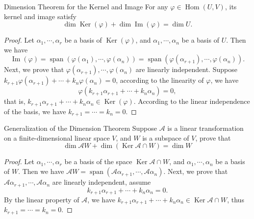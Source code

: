 \begin{theorem}{Dimension Theorem for the Kernel and Image}{}
  For any $\varphi \in \operatorname{Hom}(U, V)$,
  its kernel and image satisfy
  \begin{equation}
    \dim \operatorname{Ker} (\varphi) + \dim \operatorname{Im} (\varphi)
    = \dim U.
  \end{equation}
\end{theorem}

\begin{proof}
  Let $\alpha_1,\cdots,\alpha_r$ be a basis of $\operatorname{Ker}(\varphi)$,
  and $\alpha_1,\cdots,\alpha_n$ be a basis of $U$.
  Then we have
  \begin{equation}
    \operatorname{Im}(\varphi) = \operatorname{span}(\varphi(\alpha_1),\cdots,\varphi(\alpha_n))
    = \operatorname{span}(\varphi(\alpha_{r+1}),\cdots,\varphi(\alpha_n)).
  \end{equation}
  Next, we prove that $\varphi(\alpha_{r+1}),\cdots,\varphi(\alpha_n)$ are
  linearly independent.
  Suppose $k_{r+1}\varphi(\alpha_{r+1}) + \cdots + k_n \varphi(\alpha_n) = 0$,
  according to the linearity of $\varphi$, we have
  \begin{equation}
    \varphi(k_{r+1}\alpha_{r+1} + \cdots + k_n\alpha_n) = 0,
  \end{equation}
  that is, $k_{r+1}\alpha_{r+1} + \cdots + k_n \alpha_n \in \operatorname{Ker}(\varphi)$.
  According to the linear independence of the basis,
  we have $k_{r+1} = \cdots = k_n = 0$.
\end{proof}

\begin{example}{Generalization of the Dimension Theorem}{}
  Suppose $\mathcal{A}$ is a linear transformation on a finite-dimensional
  linear space $V$,
  and $W$ is a subspace of $V$, prove that
  \begin{equation}
    \dim \mathcal{A} W + \dim (\operatorname{Ker} \mathcal{A} \cap W) = \dim W
  \end{equation}
\end{example}

\begin{proof}
  Let $\alpha_1,\cdots,\alpha_r$ be a basis of the space $\operatorname{Ker}
  \mathcal{A} \cap W$,
  and $\alpha_1,\cdots,\alpha_n$ be a basis of $W$.
  Then we have $\mathcal{A}W = \operatorname{span} (\mathcal{A}\alpha_{r+1},\cdots,\mathcal{A}\alpha_n)$.
  Next, we prove that $\mathcal{A}\alpha_{r+1},\cdots,\mathcal{A}\alpha_n$ are
  linearly independent, assume
  \begin{equation}
    k_{r+1}\alpha_{r+1} + \cdots + k_n \alpha_n = 0.
  \end{equation}
  By the linear property of $\mathcal{A}$,
  we have $k_{r+1}\alpha_{r+1} + \cdots + k_n\alpha_n \in
  \operatorname{Ker}\mathcal{A} \cap W$,
  thus $k_{r+1} = \cdots = k_n = 0$.
\end{proof}

